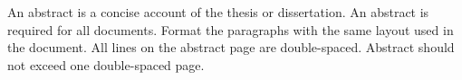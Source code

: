 
\bigskip

\noindent An abstract is a concise account of the thesis or dissertation. An abstract is required for all documents. Format the paragraphs with the same layout used in the document. All lines on the abstract page are double-spaced. Abstract should not exceed one double-spaced page.